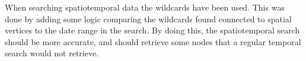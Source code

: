 When searching spatiotemporal data the wildcards have been used. This was done by adding some logic comparing the wildcards found connected to spatial vertices to the date range in the search. By doing this, the spatiotemporal search should be more accurate, and should retrieve some nodes that a regular temporal search would not retrieve.

